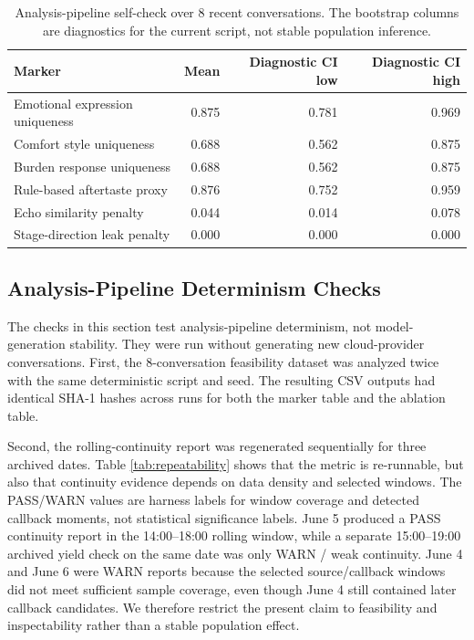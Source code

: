 \documentclass[11pt]{article}
\begin{document}
\begin{table}[t]
\centering
\caption{Analysis-pipeline self-check over 8 recent conversations. The bootstrap columns are diagnostics for the current script, not stable population inference.}
\label{tab:markers}
\begin{tabular}{lrrr}
\toprule
Marker & Mean & Diagnostic CI low & Diagnostic CI high \\
\midrule
Emotional expression uniqueness & 0.875 & 0.781 & 0.969 \\
Comfort style uniqueness & 0.688 & 0.562 & 0.875 \\
Burden response uniqueness & 0.688 & 0.562 & 0.875 \\
Rule-based aftertaste proxy & 0.876 & 0.752 & 0.959 \\
Echo similarity penalty & 0.044 & 0.014 & 0.078 \\
Stage-direction leak penalty & 0.000 & 0.000 & 0.000 \\
\bottomrule
\end{tabular}
\end{table}

\subsection{Analysis-Pipeline Determinism Checks}

The checks in this section test analysis-pipeline determinism, not model-generation stability. They were run without generating new cloud-provider conversations. First, the 8-conversation feasibility dataset was analyzed twice with the same deterministic script and seed. The resulting CSV outputs had identical SHA-1 hashes across runs for both the marker table and the ablation table.

Second, the rolling-continuity report was regenerated sequentially for three archived dates. Table \ref{tab:repeatability} shows that the metric is re-runnable, but also that continuity evidence depends on data density and selected windows. The PASS/WARN values are harness labels for window coverage and detected callback moments, not statistical significance labels. June 5 produced a PASS continuity report in the 14:00--18:00 rolling window, while a separate 15:00--19:00 archived yield check on the same date was only WARN / weak continuity. June 4 and June 6 were WARN reports because the selected source/callback windows did not meet sufficient sample coverage, even though June 4 still contained later callback candidates. We therefore restrict the present claim to feasibility and inspectability rather than a stable population effect.
\end{document}
